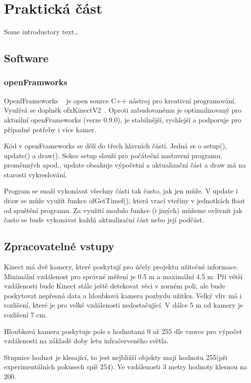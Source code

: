 \chapter{Praktická část}
Some introductory text\dots

\section{Software}
\subsection{openFramworks}
OpenfFrameworks ~\cite{1} je open source C++ nástroj pro kreativní programování.\\
Využívá se doplněk ofxKinectV2~\cite{2}. Oproti zabudovanému  je optimalizovaný pro aktuální openFrameworks (verze 0.9.0), je stabilnější, rychlejší a podporuje pro případné potřeby i více kamer.

Kód v openFrameworks se dělí do třech hlavních částí. Jedná se o setup(), update() a draw(). Sekce setup slouží pro počáteční nastavení programu, proměnných apod., update obsahuje výpočetní a aktualizační část a draw má na starosti vykreslování.

Program se snaží vykonávat všechny části tak často, jak jen může. V update i draw se může využít funkce ofGetTimef(), která vrací vteřiny v jednotkách float od spuštění programu. Za využití modulo funkce (i jiných) můžeme ovlivnit jak často se bude vykonávat každá aktualizační část nebo její podčást.

\section{Zpracovatelné vstupy}

Kinect má dvě kamery, které poskytují pro účely projektu užitečné informace. Minimální vzdálenost pro správné měření je 0.5 m a maximální 4.5 m. Při větší vzdálenosti bude Kinect stále ještě detekovat věci v zorném poli, ale bude poskytovat nepřesná data a hloubková kamera pozbydu užitku. Velký vliv má i rozlišení, které je pro velké vzdálenosti nedostačující. V dálce 5 m od kamery je rozlišení 7 cm.

Hloubková kamera poskytuje pole s hodnotami 0 až 255 dle vzorce pro výpočet vzdálenosti na základě doby letu infračerveného světla.

Stupnice hodnot je klesající, to jest nejbližší objekty mají hodnotu 255(při experimentálních pokusech spíš 254). Ve vzdálenosti 3 metry hodnoty klesnou na 200. 

